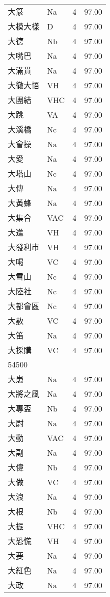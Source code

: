 \documentclass[twocolumn]{book}
\begin{document}
\begin{supertabular}{llrr}
大篆 & Na & 4 &  97.00\\
大模大樣 & D & 4 &  97.00\\
大德 & Nb & 4 &  97.00\\
大嘴巴 & Na & 4 &  97.00\\
大滿貫 & Na & 4 &  97.00\\
大徹大悟 & VH & 4 &  97.00\\
大團結 & VHC & 4 &  97.00\\
大跳 & VA & 4 &  97.00\\
大溪橋 & Nc & 4 &  97.00\\
大會操 & Na & 4 &  97.00\\
大愛 & Na & 4 &  97.00\\
大塔山 & Nc & 4 &  97.00\\
大傳 & Na & 4 &  97.00\\
大黃蜂 & Na & 4 &  97.00\\
大集合 & VAC & 4 &  97.00\\
大進 & VH & 4 &  97.00\\
大發利市 & VH & 4 &  97.00\\
大喝 & VC & 4 &  97.00\\
大雪山 & Nc & 4 &  97.00\\
大陸社 & Nc & 4 &  97.00\\
大都會區 & Nc & 4 &  97.00\\
大赦 & VC & 4 &  97.00\\
大笛 & Na & 4 &  97.00\\
大採購 & VC & 4 &  97.00\\
54500\\
大患 & Na & 4 &  97.00\\
大將之風 & Na & 4 &  97.00\\
大專盃 & Nb & 4 &  97.00\\
大尉 & Na & 4 &  97.00\\
大動 & VAC & 4 &  97.00\\
大副 & Na & 4 &  97.00\\
大偉 & Nb & 4 &  97.00\\
大做 & VC & 4 &  97.00\\
大浪 & Na & 4 &  97.00\\
大根 & Nb & 4 &  97.00\\
大振 & VHC & 4 &  97.00\\
大恐慌 & VH & 4 &  97.00\\
大要 & Na & 4 &  97.00\\
大紅色 & Na & 4 &  97.00\\
大政 & Na & 4 &  97.00\\

\end{supertabular}
\end{document}
